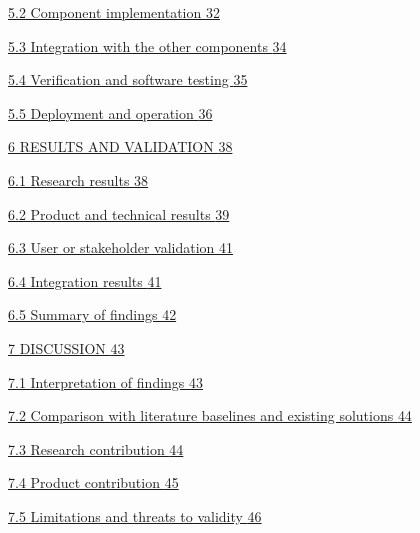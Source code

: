 \documentclass[
]{article}
\begin{document}
\protect\hyperlink{component-implementation}{5.2 Component
implementation \protect\hyperlink{component-implementation}{32}}

\protect\hyperlink{integration-with-the-other-components}{5.3
Integration with the other components
\protect\hyperlink{integration-with-the-other-components}{34}}

\protect\hyperlink{verification-and-software-testing}{5.4 Verification
and software testing
\protect\hyperlink{verification-and-software-testing}{35}}

\protect\hyperlink{deployment-and-operation}{5.5 Deployment and
operation \protect\hyperlink{deployment-and-operation}{36}}

\protect\hyperlink{results-and-validation}{6 RESULTS AND VALIDATION
\protect\hyperlink{results-and-validation}{38}}

\protect\hyperlink{research-results}{6.1 Research results
\protect\hyperlink{research-results}{38}}

\protect\hyperlink{product-and-technical-results}{6.2 Product and
technical results \protect\hyperlink{product-and-technical-results}{39}}

\protect\hyperlink{user-or-stakeholder-validation}{6.3 User or
stakeholder validation
\protect\hyperlink{user-or-stakeholder-validation}{41}}

\protect\hyperlink{integration-results}{6.4 Integration results
\protect\hyperlink{integration-results}{41}}

\protect\hyperlink{summary-of-findings}{6.5 Summary of findings
\protect\hyperlink{summary-of-findings}{42}}

\protect\hyperlink{discussion}{7 DISCUSSION
\protect\hyperlink{discussion}{43}}

\protect\hyperlink{interpretation-of-findings}{7.1 Interpretation of
findings \protect\hyperlink{interpretation-of-findings}{43}}

\protect\hyperlink{comparison-with-literature-baselines-and-existing-solutions}{7.2
Comparison with literature baselines and existing solutions
\protect\hyperlink{comparison-with-literature-baselines-and-existing-solutions}{44}}

\protect\hyperlink{research-contribution}{7.3 Research contribution
\protect\hyperlink{research-contribution}{44}}

\protect\hyperlink{product-contribution}{7.4 Product contribution
\protect\hyperlink{product-contribution}{45}}

\protect\hyperlink{limitations-and-threats-to-validity}{7.5 Limitations
and threats to validity
\protect\hyperlink{limitations-and-threats-to-validity}{46}}
\end{document}
